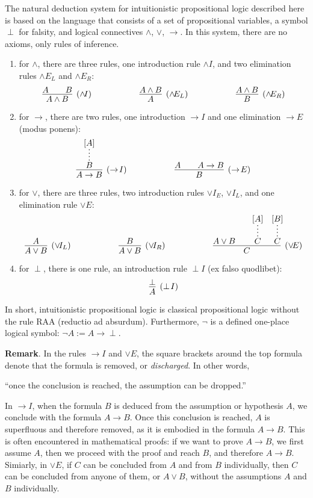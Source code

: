 \documentclass[12pt]{article}
\begin{document}
The natural deduction system for intuitionistic propositional logic described here is based on the language that consists of a set of propositional variables, a symbol $\perp$ for falsity, and logical connectives $\land$, $\lor$, $\to$.  In this system, there are no axioms, only rules of inference.
\begin{enumerate}
\item for $\land$, there are three rules, one introduction rule $\land\!I$, and two elimination rules $\land\! E_L$ and $\land\! E_R$:
$$\infer[(\land\!I)]{A\land B}{A & \quad B} \hspace{2cm} \infer[(\land\!E_L)]{A}{A \land B} \hspace{2cm} \infer[(\land\!E_R)]{B}{A \land B}$$
\item for $\to$, there are two rules, one introduction $\to\!I$ and one elimination $\to\!E$ (modus ponens):
$$ \infer[(\to\!I)]{A\to B}{\infer*{B}{[A]}} \hspace{2cm} \infer[(\to\!E)]{B}{A & \quad A \rightarrow B}$$
\item for $\lor$, there are three rules, two introduction rules $\lor\!I_E$, $\lor\!I_L$, and one elimination rule $\lor\! E$:
$$\infer[(\lor\!I_L)]{A\lor B}{A} \hspace{2cm} \infer[(\lor\!I_R)]{A\lor B}{B} \hspace{2cm} \infer[(\lor\!E)]{C}{A \lor B & \quad \infer*{C}{[A]} \quad \infer*{C}{[B]}}$$
\item for $\perp$, there is one rule, an introduction rule $\perp\!I$ (ex falso quodlibet):
$$\infer[(\perp\!I)]{A}{\perp}$$
\end{enumerate}
In short, intuitionistic propositional logic is classical propositional logic without the rule RAA (reductio ad absurdum).  Furthermore, $\neg$ is a defined one-place logical symbol: $\neg A:=A\to \perp$.

\textbf{Remark}. In the rules $\to\!I$ and $\lor\!E$, the square brackets around the top formula denote that the formula is removed, or \emph{discharged}. In other words,
\begin{center}
``once the conclusion is reached, the assumption can be dropped.''
\end{center}

In $\to\!I$, when the formula $B$ is deduced from the assumption or hypothesis $A$, we conclude with the formula $A\to B$. Once this conclusion is reached, $A$ is superfluous and therefore removed, as it is embodied in the formula $A\to B$. This is often encountered in mathematical proofs: if we want to prove $A\to B$, we first assume $A$, then we proceed with the proof and reach $B$, and therefore $A\to B$. Simiarly, in $\lor\!E$, if $C$ can be concluded from $A$ and from $B$ individually, then $C$ can be concluded from anyone of them, or $A\lor B$, without the assumptions $A$ and $B$ individually.
\end{document}
